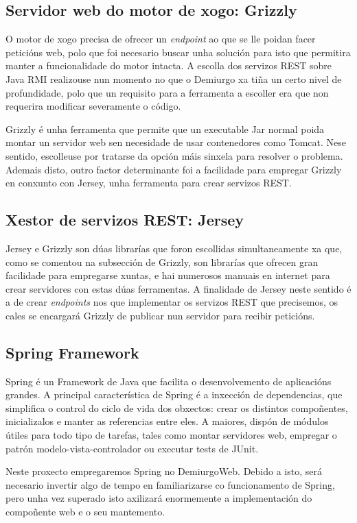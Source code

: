 \subsection{Servidor web do motor de xogo: Grizzly}
O motor de xogo precisa de ofrecer un \textit{endpoint} ao que se lle poidan
facer peticións web, polo que foi necesario buscar unha solución para isto que
permitira manter a funcionalidade do motor intacta. A escolla dos servizos REST
sobre Java RMI realizouse nun momento no que o Demiurgo xa tiña un certo nivel
de profundidade, polo que un requisito para a ferramenta a escoller era que non
requerira modificar severamente o código.
\par
Grizzly\cite{grizzly} é unha ferramenta que permite que un executable Jar normal
poida montar un servidor web sen necesidade de usar contenedores como Tomcat. Nese sentido,
escolleuse por tratarse da opción máis sinxela para resolver o problema. Ademais
disto, outro factor determinante foi a facilidade para empregar Grizzly en
conxunto con Jersey, unha ferramenta para crear servizos REST.

\subsection{Xestor de servizos REST: Jersey}
Jersey\cite{jersey} e Grizzly\cite{grizzly} son dúas librarías que foron
escollidas simultaneamente xa que, como se comentou na subsección de Grizzly, son librarías que ofrecen gran
facilidade para empregarse xuntas, e hai numerosos manuais en internet para
crear servidores con estas dúas ferramentas. A finalidade de Jersey neste
sentido é a de crear \textit{endpoints} nos que implementar os servizos REST que
precisemos, os cales se encargará Grizzly de publicar nun servidor para recibir
peticións.

\subsection{Spring Framework}
Spring\cite{springweb}\cite{spring} é un Framework de Java que facilita o
desenvolvemento de aplicacións grandes. A principal característica de Spring é a inxección de dependencias, que
simplifica o control do ciclo de vida dos obxectos: crear os distintos
compoñentes, inicializalos e manter as referencias entre eles. A maiores, dispón
de módulos útiles para todo tipo de tarefas, tales como montar servidores web,
empregar o patrón modelo-vista-controlador ou executar tests de JUnit.
\par
Neste proxecto empregaremos Spring no DemiurgoWeb. Debido a isto, será necesario
invertir algo de tempo en familiarizarse co funcionamento de Spring, pero unha
vez superado isto axilizará enormemente a implementación do compoñente web e o
seu mantemento.

